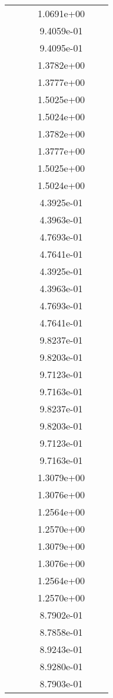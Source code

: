 \begin{xltabular}{\textwidth}{r|rS[table-format=1.3e+2]S[table-format=1.4e+2]S[table-format=1.4e+2]S[table-format=-1.5]}
&  &  & 1.0691e+00 & & \\
&  &  & 9.4059e-01 & & \\
&  &  & 9.4095e-01 & & \\
&  &  & 1.3782e+00 & & \\
&  &  & 1.3777e+00 & & \\
&  &  & 1.5025e+00 & & \\
&  &  & 1.5024e+00 & & \\
&  &  & 1.3782e+00 & & \\
&  &  & 1.3777e+00 & & \\
&  &  & 1.5025e+00 & & \\
&  &  & 1.5024e+00 & & \\
&  &  & 4.3925e-01 & & \\
&  &  & 4.3963e-01 & & \\
&  &  & 4.7693e-01 & & \\
&  &  & 4.7641e-01 & & \\
&  &  & 4.3925e-01 & & \\
&  &  & 4.3963e-01 & & \\
&  &  & 4.7693e-01 & & \\
&  &  & 4.7641e-01 & & \\
&  &  & 9.8237e-01 & & \\
&  &  & 9.8203e-01 & & \\
&  &  & 9.7123e-01 & & \\
&  &  & 9.7163e-01 & & \\
&  &  & 9.8237e-01 & & \\
&  &  & 9.8203e-01 & & \\
&  &  & 9.7123e-01 & & \\
&  &  & 9.7163e-01 & & \\
&  &  & 1.3079e+00 & & \\
&  &  & 1.3076e+00 & & \\
&  &  & 1.2564e+00 & & \\
&  &  & 1.2570e+00 & & \\
&  &  & 1.3079e+00 & & \\
&  &  & 1.3076e+00 & & \\
&  &  & 1.2564e+00 & & \\
&  &  & 1.2570e+00 & & \\
&  &  & 8.7902e-01 & & \\
&  &  & 8.7858e-01 & & \\
&  &  & 8.9243e-01 & & \\
&  &  & 8.9280e-01 & & \\
&  &  & 8.7903e-01 & & \\

\end{xltabular}
